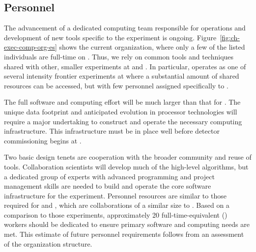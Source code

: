 \begin{dunetable}
\end{dunetable}

\subsection{Personnel}
\label{sec:exec-comp-gov-personnel}

The advancement of a dedicated  computing team responsible for operations and development of new tools specific to the  experiment is ongoing. %
Figure~\ref{fig:ch-exec-comp-org-es} shows the current  organization, where %
only a few of the listed individuals are full-time on .  Thus, we rely on common tools and techniques shared with other, smaller experiments at  and . In particular,  operates as one of several intensity frontier experiments at  where a substantial amount of shared resources can be accessed, but with few personnel assigned specifically to .  %

The full  software and computing effort will be much larger than that for . %
The unique  data footprint and anticipated evolution in processor technologies will require a major undertaking to construct and operate the necessary computing infrastructure. 
This infrastructure must be in place  well before detector commissioning begins at .


Two basic design tenets are cooperation with the broader community and reuse of tools. Collaboration scientists will develop much of the high-level algorithms, but a dedicated group of experts with advanced programming and project management skills are needed to build and operate the core software infrastructure for the experiment. %
Personnel resources are similar to those required for  and , which are collaborations of a similar size to . %
Based on a comparison to those experiments, approximately 20 full-time-equivalent () workers should be dedicated to ensure primary  software and computing needs are met. %
This estimate of future personnel requirements follows from an assessment of the  organization structure.

